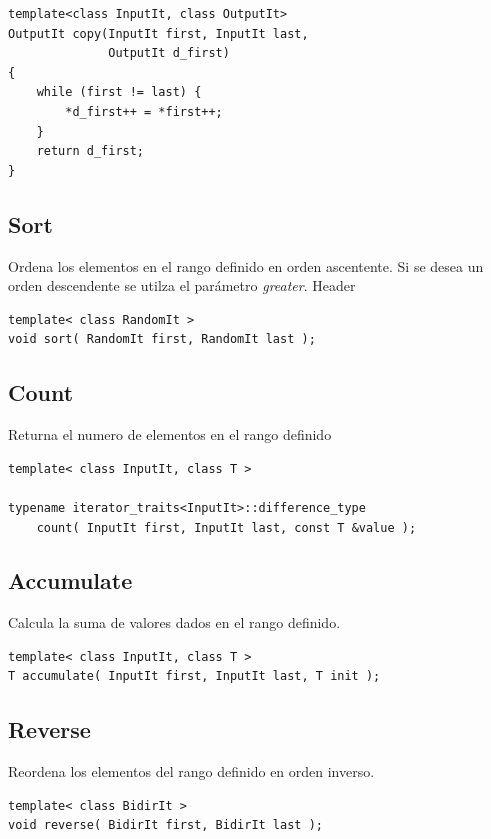 \documentclass{article}
\begin{document}
\begin{verbatim}
template<class InputIt, class OutputIt>
OutputIt copy(InputIt first, InputIt last, 
              OutputIt d_first)
{
    while (first != last) {
        *d_first++ = *first++;
    }
    return d_first;
}
\end{verbatim}

\subsection{Sort}
Ordena los elementos en el rango definido en orden ascentente. Si se desea un orden descendente se utilza el par\' ametro \textit{greater}.
Header
\begin{verbatim} 
template< class RandomIt >
void sort( RandomIt first, RandomIt last );
\end{verbatim}
\subsection{Count}
Returna el numero de elementos en el rango definido
\begin{verbatim}
template< class InputIt, class T >

typename iterator_traits<InputIt>::difference_type
    count( InputIt first, InputIt last, const T &value );
    \end{verbatim}
\subsection{Accumulate}
Calcula la suma de valores dados en el rango definido.
\begin{verbatim}
template< class InputIt, class T >
T accumulate( InputIt first, InputIt last, T init );
\end{verbatim}
\subsection{Reverse}
Reordena los elementos del rango definido en orden inverso.
\begin{verbatim}
template< class BidirIt >
void reverse( BidirIt first, BidirIt last );
	
\end{verbatim}
\end{document}
